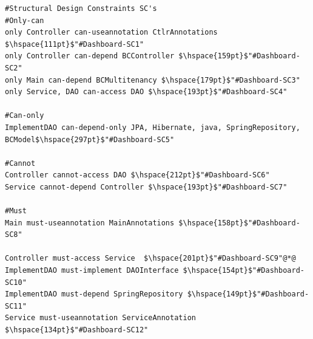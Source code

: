 \documentclass[12pt]{article}
\begin{document}
\vspace{0.2cm}
\begin{lstlisting}[style=colorido, caption={\textcolor{blue}{Dashboard microservice's architectural design specification.}},label={list:especArquiteturalDashboard}
]
#Structural Design Constraints SC's
#Only-can
only Controller can-useannotation CtlrAnnotations $\hspace{111pt}$"#Dashboard-SC1"
only Controller can-depend BCController	$\hspace{159pt}$"#Dashboard-SC2"
only Main can-depend BCMultitenancy	$\hspace{179pt}$"#Dashboard-SC3"
only Service, DAO can-access DAO $\hspace{193pt}$"#Dashboard-SC4"

#Can-only
ImplementDAO can-depend-only JPA, Hibernate, java, SpringRepository, BCModel$\hspace{297pt}$"#Dashboard-SC5"

#Cannot
Controller cannot-access DAO $\hspace{212pt}$"#Dashboard-SC6"
Service cannot-depend Controller $\hspace{193pt}$"#Dashboard-SC7"

#Must
Main must-useannotation MainAnnotations	$\hspace{158pt}$"#Dashboard-SC8"

Controller must-access Service	$\hspace{201pt}$"#Dashboard-SC9"@*@
ImplementDAO must-implement DAOInterface $\hspace{154pt}$"#Dashboard-SC10"
ImplementDAO must-depend SpringRepository $\hspace{149pt}$"#Dashboard-SC11"
Service must-useannotation ServiceAnnotation $\hspace{134pt}$"#Dashboard-SC12"
\end{lstlisting}
\end{document}
